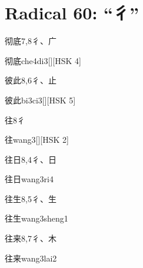 
\section*{Radical 60: ``⼻''}

\begin{entry}{彻底}{7,8}{⼻、⼴}
  \begin{phonetics}{彻底}{che4di3}[][HSK 4]
  \end{phonetics}
\end{entry}

\begin{entry}{彼此}{8,6}{⼻、⽌}
  \begin{phonetics}{彼此}{bi3ci3}[][HSK 5]
  \end{phonetics}
\end{entry}

\begin{entry}{往}{8}{⼻}
  \begin{phonetics}{往}{wang3}[][HSK 2]
  \end{phonetics}
\end{entry}

\begin{entry}{往日}{8,4}{⼻、⽇}
  \begin{phonetics}{往日}{wang3ri4}
  \end{phonetics}
\end{entry}

\begin{entry}{往生}{8,5}{⼻、⽣}
  \begin{phonetics}{往生}{wang3sheng1}
  \end{phonetics}
\end{entry}

\begin{entry}{往来}{8,7}{⼻、⽊}
  \begin{phonetics}{往来}{wang3lai2}
  \end{phonetics}
\end{entry}

